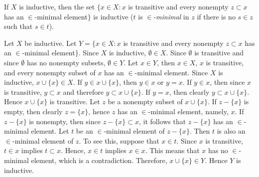  If $X$ is inductive, then the set $\{ x \in X : x$
is transitive and every nonempty $z \subset x$ has an
$\in$-minimal element$\}$ is inductive ($t$ is
$\in$-\textit{minimal} in $z$ if there is no $s \in z$ such
that $s \in t$).
\begin{solution}
  Let $X$ be inductive. Let $Y = \{ x \in X : x$ is transitive and
  every nonempty $z \subset x$ has an $\in$-minimal element$\}$.
  Since $X$ is inductive, $\emptyset \in X$. Since $\emptyset$ is
  transitive and since $\emptyset$ has no nonempty subsets,
  $\emptyset \in Y$. Let $x \in Y$, then $x \in X$, $x$ is transitive,
  and every nonempty subset of $x$ has an $\in$-minimal element. Since
  $X$ is inductive, $x \cup \{ x \} \in X$. If $y \in x \cup \{ x \}$,
  then $y \in x$ or $y = x$. If $y \in x$, then since $x$ is transitive,
  $y \subset x$ and therefore $y \subset x \cup \{ x \}$. If $y = x$,
  then clearly $ y \subset x \cup \{ x \}$. Hence $x \cup \{ x \}$ is
  transitive. Let $z$ be a nonempty subset of $x \cup \{ x \}$. If 
  $z - \{ x \}$ is empty, then clearly $z = \{ x \}$, hence $z$ has an
  $\in$-minimal element, namely, $x$. If $z - \{ x \}$ is nonempty, then since $z - \{ x \} \subset x$, it follows that $z - \{ x \}$ has an
  $\in$-minimal element. Let $t$ be an $\in$-minimal element of
  $z - \{ x \}$. Then $t$ is also an $\in$-minimal element of $z$. To
  see this, suppose that $x \in t$. Since $x$ is transitive, $t \in x$
  implies $t \subset x$. Hence, $x \in t$ implies $x \in x$. This means
  that $x$ has no $\in$-minimal element, which is a contradiction.
  Therefore, $x \cup \{ x \} \in Y$. Hence $Y$ is inductive.
\end{solution}